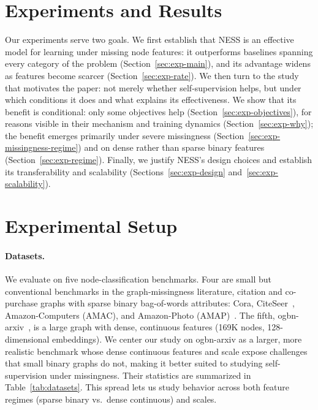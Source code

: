 
\section{Experiments and Results}\label{sec:experiments}


Our experiments serve two goals. We first establish that NESS is an effective model for learning under missing node features: it outperforms baselines spanning every category of the problem (Section~\ref{sec:exp-main}), and its advantage widens as features become scarcer (Section~\ref{sec:exp-rate}). We then turn to the study that motivates the paper: not merely whether self-supervision helps, but under which conditions it does and what explains its effectiveness.
We show that its benefit is conditional: only some objectives help (Section~\ref{sec:exp-objectives}), for reasons visible in their mechanism and training dynamics (Section~\ref{sec:exp-why}); the benefit emerges primarily under severe missingness (Section~\ref{sec:exp-missingness-regime}) and on dense rather than sparse binary features (Section~\ref{sec:exp-regime}). Finally, we justify NESS's design choices and establish its transferability and scalability (Sections~\ref{sec:exp-design} and~\ref{sec:exp-scalability}).


\section{Experimental Setup}
\label{sec:setup}

\paragraph{Datasets.} We evaluate on five node-classification benchmarks. Four are small but conventional benchmarks in the graph-missingness literature, citation and co-purchase graphs with sparse binary bag-of-words attributes: Cora, CiteSeer~\cite{yang2016revisiting}, Amazon-Computers (AMAC), and Amazon-Photo (AMAP)~\cite{shchur2018pitfalls}. The fifth, ogbn-arxiv~\cite{hu2020open}, is a large graph with dense, continuous features (169K nodes, 128-dimensional embeddings).
We center our study on ogbn-arxiv as a larger, more realistic benchmark whose dense continuous features and scale expose challenges that small binary graphs do not, making it better suited to studying self-supervision under missingness.
Their statistics are summarized in Table~\ref{tab:datasets}. This spread lets us study behavior across both feature regimes (sparse binary vs.\ dense continuous) and scales. 


